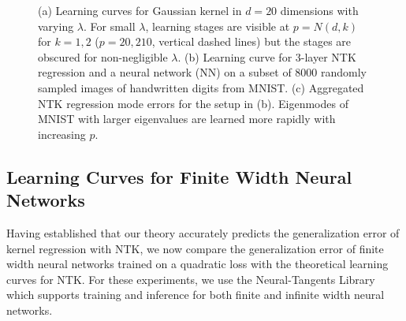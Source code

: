 \documentclass{article}
\begin{document}
\begin{figure}
    \centering
    \caption{(a) Learning curves for Gaussian kernel in $d=20$ dimensions with varying $\lambda$. For small $\lambda$, learning stages are visible at $p=N(d,k)$ for $k=1,2$ ($p=20,210$, vertical dashed lines) but the stages are obscured for non-negligible $\lambda$. (b)  Learning curve for 3-layer NTK regression and a neural network (NN) on a subset of 8000 randomly sampled images of handwritten digits from MNIST. (c) Aggregated NTK regression mode errors for the setup in (b).  Eigenmodes of MNIST with larger eigenvalues are learned more rapidly with increasing $p$. 
    \label{fig:RBF}}
\end{figure}




\subsection{Learning Curves for Finite Width Neural Networks}

Having established that our theory accurately predicts the generalization error of kernel regression with NTK, we now compare the generalization error of finite width neural networks trained on a quadratic loss with the theoretical learning curves for NTK. For these experiments, we use the Neural-Tangents Library \cite{neuraltangents2020} which supports training and inference for both finite and infinite width neural networks.
\end{document}
